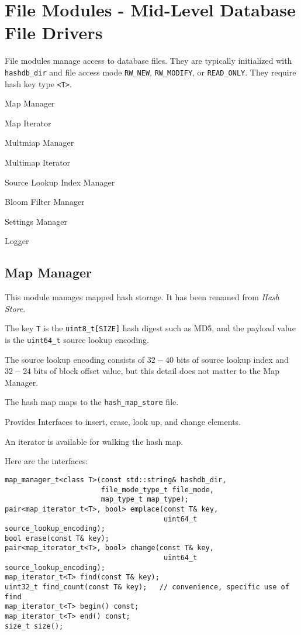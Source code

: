 \documentclass[12pt,twoside]{article}
\begin{document}
\section{File Modules - Mid-Level Database File Drivers}
File modules manage access to database files.
They are typically initialized with \texttt{hashdb\_dir} and file access mode
\texttt{RW\_NEW}, \texttt{RW\_MODIFY}, or \texttt{READ\_ONLY}.
They require hash key type \texttt{<T>}.

\begin{compactitem}
\item Map Manager
\item Map Iterator
\item Multmiap Manager
\item Multimap Iterator
\item Source Lookup Index Manager
\item Bloom Filter Manager
\item Settings Manager
\item Logger
\end{compactitem}

\subsection{Map Manager}
This module manages mapped hash storage.
It has been renamed from \textit{Hash Store}.
\begin{compactitem}
\item The key \texttt{T} is the \texttt{uint8\_t[SIZE]} hash digest such as MD5,
and the payload value is the \texttt{uint64\_t} source lookup encoding.
\item The source lookup encoding consists of $32-40$ bits
of source lookup index and $32-24$ bits of block offset value,
but this detail does not matter to the Map Manager.
\item The hash map maps to the \texttt{hash\_map\_store} file.
\item Provides Interfaces to insert, erase, look up, and change elements.
\item An iterator is available for walking the hash map.
\end{compactitem}

Here are the interfaces:
\begin{small}
\begin{verbatim}
map_manager_t<class T>(const std::string& hashdb_dir,
                       file_mode_type_t file_mode,
                       map_type_t map_type);
pair<map_iterator_t<T>, bool> emplace(const T& key,
                                      uint64_t source_lookup_encoding);
bool erase(const T& key);
pair<map_iterator_t<T>, bool> change(const T& key,
                                      uint64_t source_lookup_encoding);
map_iterator_t<T> find(const T& key);
uint32_t find_count(const T& key);   // convenience, specific use of find
map_iterator_t<T> begin() const;
map_iterator_t<T> end() const;
size_t size();
\end{verbatim}
\end{small}
\end{document}
